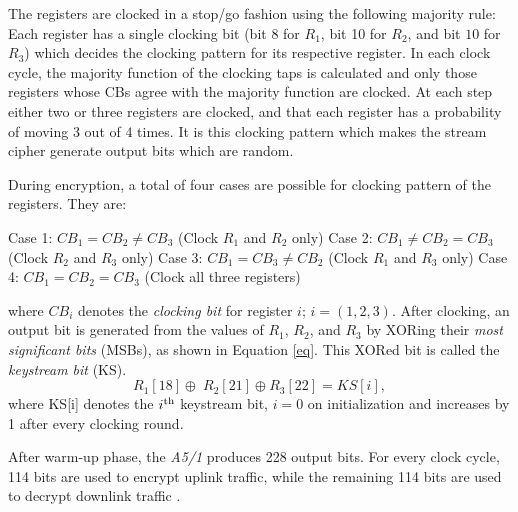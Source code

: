 \documentclass{llncs}
\begin{document}
The registers are clocked in a stop/go fashion using the following majority rule: Each register has a single clocking bit (bit $8$ for $R_{1}$, bit 10 for $R_{2}$, and bit $10$ for $R_{3}$) which decides the clocking pattern for its respective register. In each clock cycle, the majority function of the clocking taps is calculated and only those registers whose CBs agree with the majority function are clocked. At each step either two or three registers are clocked, and that each register has a probability of moving $3$ out of $4$ times. It is this clocking pattern which makes the stream cipher generate output bits which are random.

During encryption, a total of four cases are possible for clocking pattern of the registers. They are:
\begin{center}
Case 1: $ CB_1 = CB_2 \neq CB_3$ (Clock $R_{1}$ and $R_{2}$ only)
\newline Case 2: $CB_1 \neq CB_2 = CB_3$ (Clock $R_{2}$ and $R_{3}$ only)
\newline Case 3: $CB_1 = CB_3 \neq CB_2$ (Clock $R_{1}$ and $R_{3}$ only)
\newline Case 4: $CB_1 = CB_2 = CB_3$ (Clock  all three registers)
\newline
\end{center}
where $CB_i$ denotes the \emph{clocking bit} for register $i$; $i = (1, 2, 3)$.
\newline\newline
After clocking, an output bit is generated from the values of $R_{1}$, $R_{2}$, and $R_{3}$ by XORing their \emph{most significant bits} (MSBs), as shown in Equation \ref{eq}. This XORed bit is called the \emph {keystream bit} (KS).
\begin{equation}
R_{1}[18] \oplus\; R_{2}[21] \oplus R_{3}[22] = KS[i],
\label{eq}
\end{equation}
where KS[i] denotes the $i\textsuperscript{th}$ keystream bit, $i=0$ on initialization and increases by 1 after every clocking round.


After warm-up phase, the \emph{A5/1} produces 228 output bits. For every clock cycle, 114 bits are used to encrypt uplink traffic, while the remaining 114 bits are used to decrypt downlink traffic \cite{[Gend]}.
\end{document}
